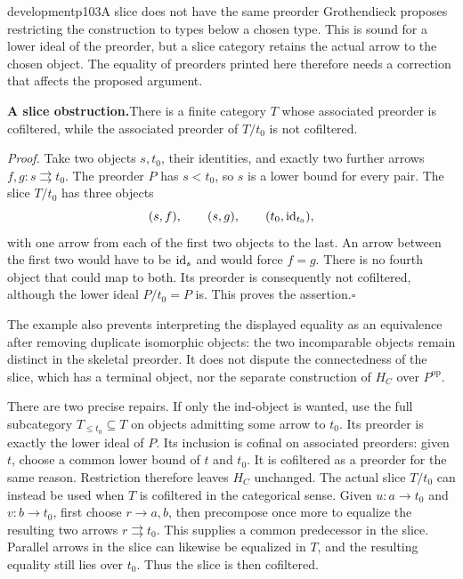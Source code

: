 \begin{itemize}[leftmargin=2.5em]
\begin{dcomment}{development}{p103}{A slice does not have the same preorder}
Grothendieck proposes restricting the construction to types below a chosen type. This is sound for a lower ideal of the preorder, but a slice category retains the actual arrow to the chosen object. The equality of preorders printed here therefore needs a correction that affects the proposed argument.

\textbf{A slice obstruction.}\ours\quad There is a finite category $T$ whose associated preorder is cofiltered, while the associated preorder of $T/t_0$ is not cofiltered.

\emph{Proof.} Take two objects $s,t_0$, their identities, and exactly two further arrows $f,g:s\rightrightarrows t_0$. The preorder $P$ has $s<t_0$, so $s$ is a lower bound for every pair. The slice $T/t_0$ has three objects
\[
 (s,f),\qquad (s,g),\qquad(t_0,\mathrm{id}_{t_0}),
\]
with one arrow from each of the first two objects to the last. An arrow between the first two would have to be $\mathrm{id}_s$ and would force $f=g$. There is no fourth object that could map to both. Its preorder is consequently not cofiltered, although the lower ideal $P/t_0=P$ is. This proves the assertion.\hfill$\square$

The example also prevents interpreting the displayed equality as an equivalence after removing duplicate isomorphic objects: the two incomparable objects remain distinct in the skeletal preorder. It does not dispute the connectedness of the slice, which has a terminal object, nor the separate construction of $H_C$ over $P^{\mathrm{op}}$.

There are two precise repairs. If only the ind-object is wanted, use the full subcategory $T_{\le t_0}\subseteq T$ on objects admitting some arrow to $t_0$. Its preorder is exactly the lower ideal of $P$. Its inclusion is cofinal on associated preorders: given $t$, choose a common lower bound of $t$ and $t_0$. It is cofiltered as a preorder for the same reason. Restriction therefore leaves $H_C$ unchanged. The actual slice $T/t_0$ can instead be used when $T$ is cofiltered in the categorical sense. Given $u:a\to t_0$ and $v:b\to t_0$, first choose $r\to a,b$, then precompose once more to equalize the resulting two arrows $r\rightrightarrows t_0$. This supplies a common predecessor in the slice. Parallel arrows in the slice can likewise be equalized in $T$, and the resulting equality still lies over $t_0$. Thus the slice is then cofiltered.


\end{dcomment}
\end{itemize}
